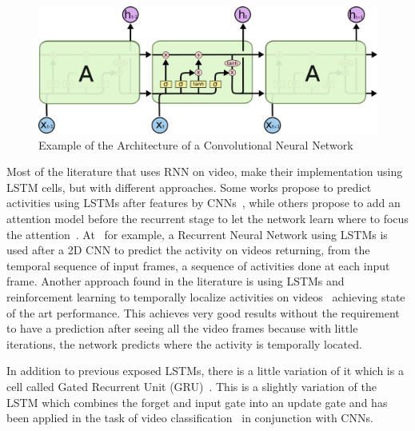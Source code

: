 

\begin{figure}[ht]
\begin{center}
\includegraphics[width=0.8\linewidth]{img/stateofart/lstm_chain}
\end{center}
\caption{Example of the Architecture of a Convolutional Neural Network}
\label{fig:lstm_chain}
\end{figure}

Most of the literature that uses RNN on video, make their implementation using LSTM cells, but with different approaches. Some works propose to predict activities using LSTMs after features by CNNs~\cite{yao2015describing}, while others propose to add an attention model before the recurrent stage to let the network learn where to focus the attention~\cite{sharma2015action,piergiovanni2016temporal}. At~\cite{yeung2015every} for example, a Recurrent Neural Network using LSTMs is used after a 2D CNN to predict the activity on videos returning, from the temporal sequence of input frames, a sequence of activities done at each input frame.
Another approach found in the literature is using LSTMs and reinforcement learning to temporally localize activities on videos~\cite{yeung2015end} achieving state of the art performance. This achieves very good results without the requirement to have a prediction after seeing all the video frames because with little iterations, the network predicts where the activity is temporally located.

In addition to previous exposed LSTMs, there is a little variation of it which is a cell called Gated Recurrent Unit (GRU)~\cite{cho2014learning}. This is a slightly variation of the LSTM which combines the forget and input gate into an update gate and has been applied in the task of video classification~\cite{ballas2015delving} in conjunction with CNNs.

